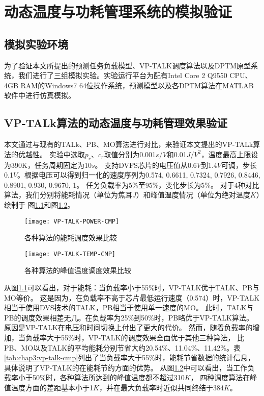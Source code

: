 


\chapter{动态温度与功耗管理系统的模拟验证}
\label{cha:DPTMexperiments}

\section{模拟实验环境}
为了验证本文所提出的预测任务负载模型、VP-TALK调度算法以及DPTM原型系统，我们进行了三组模拟实验。实验运行平台为配有Intel Core 2 Q9550 CPU、4GB RAM的Windows7 64位操作系统，预测模型以及各DPTM算法在MATLAB软件中进行仿真模拟。

\section{VP-TALk算法的动态温度与功耗管理效果验证}
本文通过与现有的TALk、PB、MO算法进行对比，来验证本文提出的VP-TALk算法的优越性。 实验中选取$p_r$、$c_r$取值分别为0.001$s$/$V$和0.01$J$/$V^2$，温度最高上限设为390K，任务周期固定为10$s$。 支持DVFS芯片的电压值从0.6$V$到1.4$V$可调，步长0.1$V$。根据电压可以得到归一化的速度序列为{0.574, 0.6611, 0.7324, 0.7926, 0.8446, 0.8901, 0.930, 0.9670, 1}。 任务负载率为5\%至95\%，变化步长为5\%。 对于4种对比算法，我们分别将能耗情况（单位为焦耳$J$）和峰值温度情况（单位为绝对温度$K$）绘制于 图\ref{fig:vp-talk-power-cmp}和图\ref{fig:vp-talk-temp-cmp}。
\begin{figure}[H]
  \centering
  \texttt{[image: VP-TALK-POWER-CMP]}
  \caption{各种算法的能耗调度效果比较}
  \label{fig:vp-talk-power-cmp}
\end{figure}
\begin{figure}[H]
  \centering
  \texttt{[image: VP-TALK-TEMP-CMP]}
  \caption{各种算法的峰值温度调度效果比较}
  \label{fig:vp-talk-temp-cmp}
\end{figure}
从图\ref{fig:vp-talk-power-cmp}可以看出，对于能耗：当负载率小于55\%时，VP-TALK优于TALK、PB与MO等价。 这是因为，在负载率不高于芯片最低运行速度（0.574）时，VP-TALK相当于使用DVS技术的TALK，PB相当于使用单一速度的MO。 此时，TALK与PB的调度效果相差无几。在负载率为25\%到50\%时，PB略优于VP-TALK算法。 原因是VP-TALK在电压和时间切换上付出了更大的代价。 然而，随着负载率的增加，当负载率大于55\%时，VP-TALK的调度效果全面优于其他三种算法， 比PB、MO以及TALK的平均能耗分别节省大约20.54\%、11.04\%、11.42\%。表\ref{tab:chap3:vp-talk-cmp}列出了当负载率大于55\%时，能耗节省数据的统计信息， 具体说明了VP-TALK的在能耗节约方面的优势。
从图\ref{fig:vp-talk-temp-cmp}中可以看出，当工作负载率小于50\%时，各种算法所达到的峰值温度都不超过310$K$， 四种调度算法在峰值温度方面的差距基本小于1$K$，并在最大负载率时近似共同终结于384$K$。

